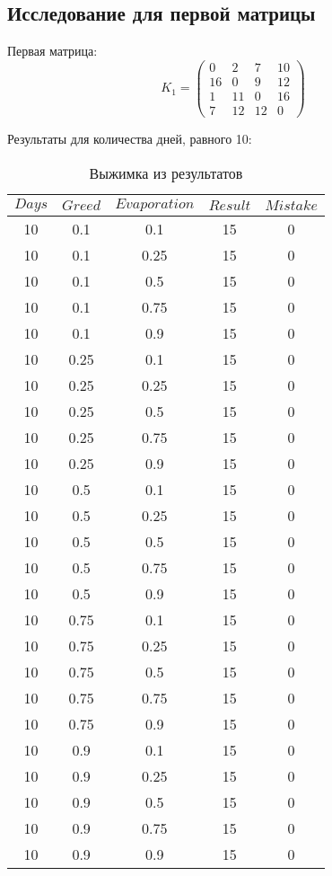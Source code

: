 \documentclass{bmstu}
\begin{document}
\subsection{Исследование для первой матрицы}
Первая матрица:
\begin{equation}
	\label{eq:kd1}
	K_{1} = \begin{pmatrix}
		0 &2 &7 &10 \\
            16 &0& 9& 12 \\
            1 &11 &0 &16 \\
            7 &12 &12& 0
	\end{pmatrix}
\end{equation}

\newpage
Результаты для количества дней, равного 10:
\begin{center}
	\captionsetup{justification=raggedright,singlelinecheck=off}
	\begin{longtable}[c]{|c|c|c|c|c|}
		\caption{Выжимка из результатов\label{tbl:table_1}}\\ \hline
		$Days$ & $Greed$ & $Evaporation$ & $Result$ & $Mistake$ \\ \hline
		10 & 0.1 & 0.1 & 15 & 0 \\\hline
10 & 0.1 & 0.25 & 15 & 0 \\\hline
10 & 0.1 & 0.5 & 15 & 0 \\\hline
10 & 0.1 & 0.75 & 15 & 0 \\\hline
10 & 0.1 & 0.9 & 15 & 0 \\\hline
10 & 0.25 & 0.1 & 15 & 0 \\\hline
10 & 0.25 & 0.25 & 15 & 0 \\\hline
10 & 0.25 & 0.5 & 15 & 0 \\\hline
10 & 0.25 & 0.75 & 15 & 0 \\\hline
10 & 0.25 & 0.9 & 15 & 0 \\\hline
10 & 0.5 & 0.1 & 15 & 0 \\\hline
10 & 0.5 & 0.25 & 15 & 0 \\\hline
10 & 0.5 & 0.5 & 15 & 0 \\\hline
10 & 0.5 & 0.75 & 15 & 0 \\\hline
10 & 0.5 & 0.9 & 15 & 0 \\\hline
10 & 0.75 & 0.1 & 15 & 0 \\\hline
10 & 0.75 & 0.25 & 15 & 0 \\\hline
10 & 0.75 & 0.5 & 15 & 0 \\\hline
10 & 0.75 & 0.75 & 15 & 0 \\\hline
10 & 0.75 & 0.9 & 15 & 0 \\\hline
10 & 0.9 & 0.1 & 15 & 0 \\\hline
10 & 0.9 & 0.25 & 15 & 0 \\\hline
10 & 0.9 & 0.5 & 15 & 0 \\\hline
10 & 0.9 & 0.75 & 15 & 0 \\\hline
10 & 0.9 & 0.9 & 15 & 0 \\\hline
	\end{longtable}
\end{center}
\end{document}
